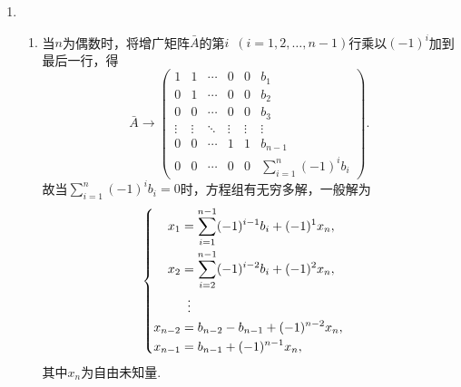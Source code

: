 \begin{enumerate}
    \item \begin{enumerate}
              \item 当$n$为偶数时，将增广矩阵$\bar{A}$的第$i\enspace(i=1,2,\ldots,n-1)$行乘以$(-1)^i$加到最后一行，得
                    \[ \bar{A}\rightarrow\begin{pmatrix}
                            1      & 1      & \cdots & 0      & 0      & b_1                                  \\
                            0      & 1      & \cdots & 0      & 0      & b_2                                  \\
                            0      & 0      & \cdots & 0      & 0      & b_3                                  \\
                            \vdots & \vdots & \ddots & \vdots & \vdots & \vdots                               \\
                            0      & 0      & \cdots & 1      & 1      & b_{n-1}                              \\
                            0      & 0      & \cdots & 0      & 0      & \displaystyle\sum_{i=1}^{n}(-1)^ib_i
                        \end{pmatrix}. \]
                    故当$\displaystyle\sum_{i=1}^{n}(-1)^ib_i=0$时，方程组有无穷多解，一般解为
                    \[\begin{cases} \begin{aligned}
                                x_1     & =\displaystyle\sum_{i=1}^{n-1}(-1)^{i-1}b_i+(-1)^1x_n, \\
                                x_2     & =\displaystyle\sum_{i=2}^{n-1}(-1)^{i-2}b_i+(-1)^2x_n, \\
                                        & \vdotswithin{ = }                                      \\
                                x_{n-2} & =b_{n-2}-b_{n-1}+(-1)^{n-2}x_n,                        \\
                                x_{n-1} & =b_{n-1}+(-1)^{n-1}x_n,                                \\
                            \end{aligned} \end{cases}\]
                    其中$x_n$为自由未知量.


\end{enumerate}
\end{enumerate}
